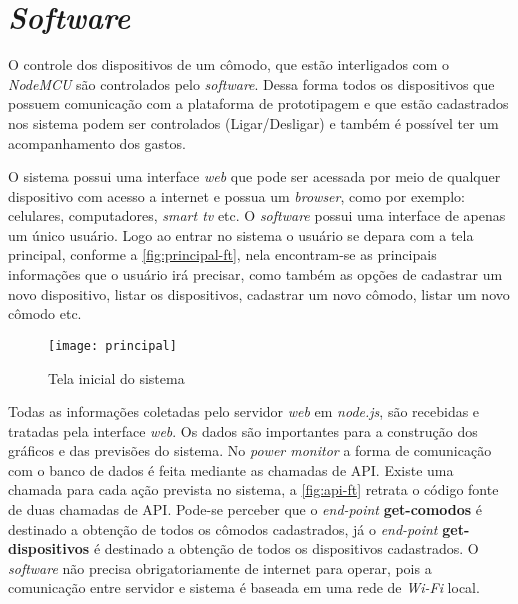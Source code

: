 \section[\textit{Software}]{\textit{Software}}\label{soft-sec}
O controle dos dispositivos de um cômodo, que estão interligados com o \textit{NodeMCU} são controlados pelo \textit{software}. Dessa forma
todos os dispositivos que possuem comunicação com a plataforma de prototipagem e que estão cadastrados nos sistema podem ser controlados (Ligar/Desligar) e também
é possível ter um acompanhamento dos gastos.

O sistema possui uma interface \textit{web} que pode ser acessada por meio de qualquer dispositivo com acesso a internet e possua um 
\textit{browser}, como por exemplo: celulares, computadores, \textit{smart tv} etc. O \textit{software} possui uma interface de apenas um único usuário. 
Logo ao entrar no sistema o usuário se depara com a tela principal, conforme a \autoref{fig:principal-ft}, nela encontram-se
as principais informações que o usuário irá precisar, como também as opções de cadastrar um novo dispositivo, listar os dispositivos, cadastrar um novo cômodo,
listar um novo cômodo etc.

\begin{figure}[h!]
	\texttt{[image: principal]}
	\centering
	\caption[Tela inicial do sistema]{Tela inicial do sistema}
	\label{fig:principal-ft}
\end{figure}
\FloatBarrier

Todas as informações coletadas pelo servidor \textit{web} em \textit{node.js}, são recebidas e tratadas pela interface \textit{web}. 
Os dados são importantes para a construção dos gráficos e das previsões do sistema. No \textit{power monitor}
a forma de comunicação com o banco de dados é feita mediante as chamadas de API. Existe uma chamada para cada ação prevista no sistema, a \autoref{fig:api-ft}
retrata o código fonte de duas chamadas de API. Pode-se perceber que o \textit{end-point\protect\footnotemark}
\textbf{get-comodos} é destinado a obtenção de todos os cômodos cadastrados, já o \textit{end-point} \textbf{get-dispositivos} é destinado a 
obtenção de todos os dispositivos cadastrados. O \textit{software} não precisa obrigatoriamente de internet para operar, pois a comunicação entre servidor e sistema é
baseada em uma rede de \textit{Wi-Fi} local. 


